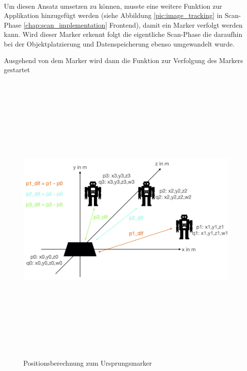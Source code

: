 \\
Um diesen Ansatz umsetzen zu können, musste eine weitere Funktion zur Applikation hinzugefügt werden (siehe Abbildung \ref{pic:image_tracking} 
in Scan-Phase \ref{chap:scan_implementation} Frontend), damit ein Marker verfolgt werden kann. Wird dieser Marker erkennt folgt die eigentliche Scan-Phase 
die daraufhin bei der Objektplatzierung und Datenspeicherung ebenso umgewandelt wurde. 

Ausgehend von dem Marker wird dann die Funktion zur Verfolgung des Markers gestartet

\begin{figure}[hbt!]
    \centering
    \includegraphics[width=15cm,height=15cm,keepaspectratio]{4Umsetzung/Bilder/difcalc.jpeg}
    \caption{Positionsberechnung zum Ursprungsmarker}
    \label{pic:differenztoinitial}
\end{figure}

